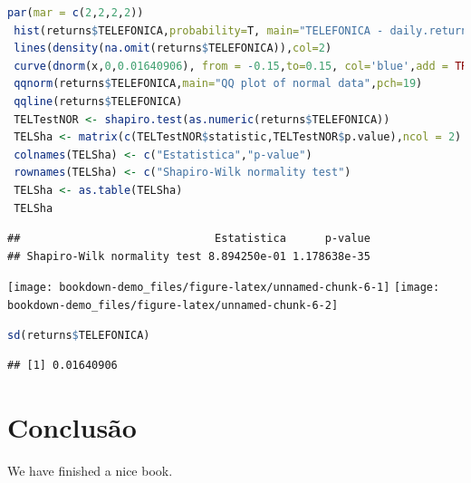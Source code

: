 \documentclass[
  12pt,
  brazil,
  a4paper,
  openany]{book}
\begin{document}
\begin{lstlisting}[language=R]
 par(mar = c(2,2,2,2))
 hist(returns$TELEFONICA,probability=T, main="TELEFONICA - daily.returns",xlab="Approximately normally distributed data",breaks=100)
 lines(density(na.omit(returns$TELEFONICA)),col=2)
 curve(dnorm(x,0,0.01640906), from = -0.15,to=0.15, col='blue',add = TRUE)
 qqnorm(returns$TELEFONICA,main="QQ plot of normal data",pch=19)
 qqline(returns$TELEFONICA)
 TELTestNOR <- shapiro.test(as.numeric(returns$TELEFONICA))
 TELSha <- matrix(c(TELTestNOR$statistic,TELTestNOR$p.value),ncol = 2)
 colnames(TELSha) <- c("Estatistica","p-value")
 rownames(TELSha) <- c("Shapiro-Wilk normality test")
 TELSha <- as.table(TELSha)
 TELSha
\end{lstlisting}

\begin{lstlisting}
##                              Estatistica      p-value
## Shapiro-Wilk normality test 8.894250e-01 1.178638e-35
\end{lstlisting}

\texttt{[image: bookdown-demo\_files/figure-latex/unnamed-chunk-6-1]} \texttt{[image: bookdown-demo\_files/figure-latex/unnamed-chunk-6-2]}

\begin{lstlisting}[language=R]
sd(returns$TELEFONICA)
\end{lstlisting}

\begin{lstlisting}
## [1] 0.01640906
\end{lstlisting}

\hypertarget{conclusuxe3o}{%
\chapter*{Conclusão}\label{conclusuxe3o}}

We have finished a nice book.

\printbibliography
\end{document}
